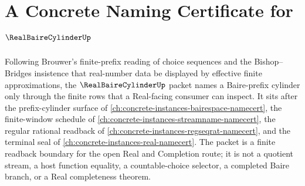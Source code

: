 \chapter{A Concrete Naming Certificate for $\RealBaireCylinderUp$}
\label{ch:concrete-instances-real-baire-cylinder-namecert}

Following Brouwer's finite-prefix reading of choice sequences and the Bishop--Bridges insistence that real-number data be displayed by effective finite approximations, the $\RealBaireCylinderUp$ packet names a Baire-prefix cylinder only through the finite rows that a Real-facing consumer can inspect. It sits after the prefix-cylinder surface of \autoref{ch:concrete-instances-bairespace-namecert}, the finite-window schedule of \autoref{ch:concrete-instances-streamname-namecert}, the regular rational readback of \autoref{ch:concrete-instances-regseqrat-namecert}, and the terminal seal of \autoref{ch:concrete-instances-real-namecert}. The packet is a finite readback boundary for the open Real and Completion route; it is not a quotient stream, a host function equality, a countable-choice selector, a completed Baire branch, or a Real completeness theorem.

